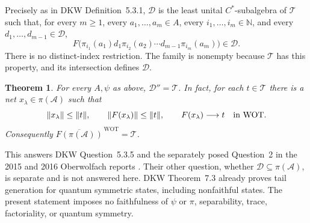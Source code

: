 \documentclass[11pt]{article}
\newtheorem{theorem}{Theorem}
\newcommand{\A}{\mathcal A}
\newcommand{\T}{\mathcal T}
\newcommand{\D}{\mathcal D}
\newcommand{\WOT}{\mathrm{WOT}}
\newcommand{\norm}[1]{\lVert#1\rVert}
\begin{document}
Precisely as in DKW Definition~5.3.1, \(\D\) is the least unital
\(C^*\)-subalgebra of \(\T\) such that, for every \(m\geq1\), every
\(a_1,\ldots,a_m\in A\), every \(i_1,\ldots,i_m\in\mathbb N\), and
every \(d_1,\ldots,d_{m-1}\in\D\),
\[
 F\bigl(\pi_{i_1}(a_1)d_1\pi_{i_2}(a_2)\cdots
          d_{m-1}\pi_{i_m}(a_m)\bigr)\in\D .
\]
There is no distinct-index restriction. The family is nonempty because
\(\T\) has this property, and its intersection defines \(\D\).

\begin{theorem}\label{main}
For every \(A,\psi\) as above, \(\D''=\T\). In fact, for each \(t\in\T\)
there is a net \(x_\lambda\in\pi(\A)\) such that
\[
 \norm{x_\lambda}\leq\norm{t},\qquad
 \norm{F(x_\lambda)}\leq\norm{t},\qquad
 F(x_\lambda)\longrightarrow t\quad\hbox{in }\WOT .
\]
Consequently \(\overline{F(\pi(\A))}^{\,\WOT}=\T\).
\end{theorem}

This answers DKW Question~5.3.5 and the separately posed Question~2
in the 2015 and 2016 Oberwolfach reports \cite{OWR15,OWR16}.
Their other question, whether \(\D\subseteq\pi(\A)\), is separate and
is not answered here. DKW Theorem~7.3 already proves tail generation
for quantum symmetric states, including nonfaithful states.
The present statement imposes no faithfulness of \(\psi\) or \(\pi\),
separability, trace, factoriality, or quantum symmetry.
\end{document}
